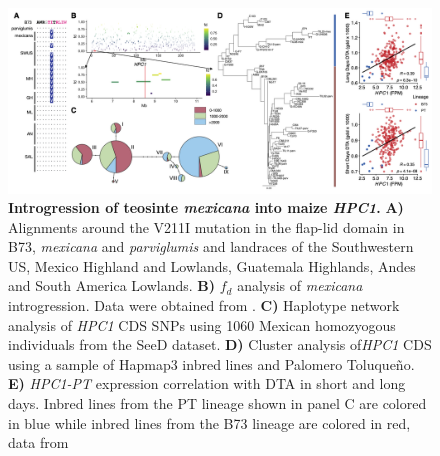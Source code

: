 \documentclass[9pt,twocolumn,twoside,lineno]{BioRxiv}
\begin{document}
\begin{figure}[!ht]
\begin{center}
\includegraphics[width=0.8\paperwidth]{Figures/Fig_6.png}
\caption{\textbf{Introgression of teosinte \textit{mexicana} into maize \textit{HPC1}.}  
\textbf{A)} Alignments around the V211I mutation in the flap-lid domain in B73, \textit{mexicana} and \textit{parviglumis} and landraces of the Southwestern US, Mexico Highland and Lowlands, Guatemala Highlands, Andes and South America Lowlands.
\textbf{B)} \(f_d\) analysis of \textit{mexicana} introgression. Data were obtained from \cite{Gonzalez-Segovia2019-jy}. 
\textbf{C)} Haplotype network analysis of \textit{HPC1} CDS SNPs using 1060 Mexican homozyogous individuals from the SeeD dataset.
\textbf{D)} Cluster analysis of\textit{HPC1} CDS using a sample of Hapmap3 inbred lines and Palomero Toluqueño.
\textbf{E)} \textit{HPC1-PT} expression correlation with DTA in short and long days. 
Inbred lines from the PT lineage shown in panel C are colored in blue while inbred lines from the B73 lineage are colored in red,
data from \cite{Kremling2018-gn}}
\label{Fig6}
\end{center}
\end{figure}
\end{document}
